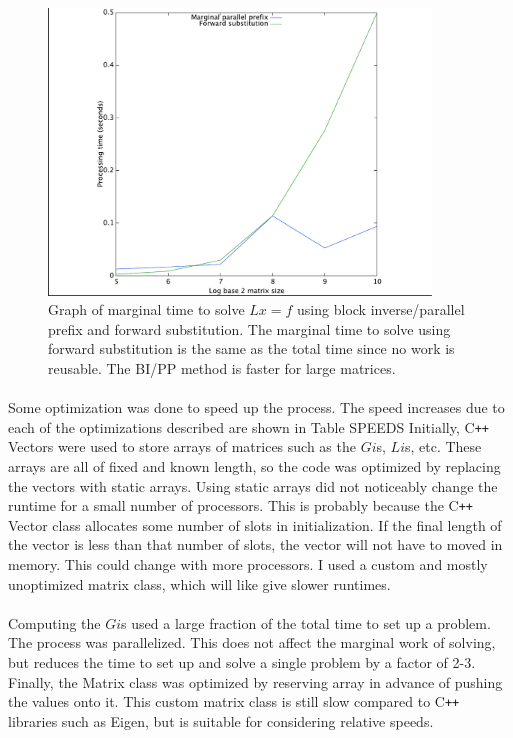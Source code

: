 \documentclass[a4paper,12pt]{article}
\begin{document}
		\begin{figure}[]
			\centering
			\caption{Graph of marginal time to solve $Lx=f$ using block inverse/parallel prefix and forward substitution.  The marginal time to solve using forward substitution is the same as the total time since no work is reusable.  The BI/PP method is faster for large matrices.}
			\label{danielMarginal}
			
			\includegraphics[width=4in]{daniel-plots-marginal}
		\end{figure}
	\paragraph*{}
		Some optimization was done to speed up the process.  The speed increases due to each of the optimizations described are shown in Table SPEEDS Initially, C\verb!++! Vectors were used to store arrays of matrices such as the $Gi$s, $Li$s, etc.  These arrays are all of fixed and known length, so the code was optimized by replacing the vectors with static arrays.  Using static arrays did not noticeably change the runtime for a small number of processors.  This is probably because the C\verb!++! Vector class allocates some number of slots in initialization.  If the final length of the vector is less than that number of slots, the vector will not have to moved in memory.  This could change with more processors.  I used a custom and mostly unoptimized matrix class, which will like give slower runtimes.  
	\paragraph*{}
		Computing the $Gi$s used a large fraction of the total time to set up a problem.  The process was parallelized.  This does not affect the marginal work of solving, but reduces the time to set up and solve a single problem by a factor of 2-3.  Finally, the Matrix class was optimized by reserving array in advance of pushing the values onto it.  This custom matrix class is still slow compared to C\verb!++! libraries such as Eigen, but is suitable for considering relative speeds.   
\end{document}
